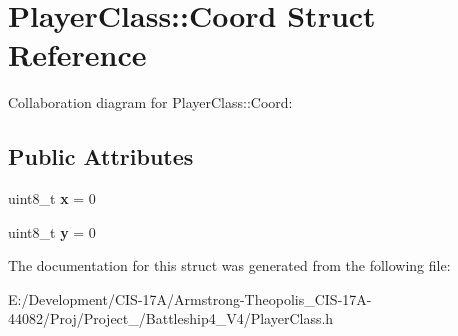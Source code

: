 \hypertarget{struct_player_class_1_1_coord}{}\section{Player\+Class\+::Coord Struct Reference}
\label{struct_player_class_1_1_coord}


Collaboration diagram for Player\+Class\+::Coord\+:
\subsection*{Public Attributes}
\begin{DoxyCompactItemize}
\item 
\mbox{\label{struct_player_class_1_1_coord_a4e31619759a35316f3d92f839202ea04}} 
uint8\+\_\+t {\bfseries x} = 0
\item 
\mbox{\label{struct_player_class_1_1_coord_add3d5b21bd7bba45189ebfe3c0737855}} 
uint8\+\_\+t {\bfseries y} = 0
\end{DoxyCompactItemize}


The documentation for this struct was generated from the following file\+:\begin{DoxyCompactItemize}
\item 
E\+:/\+Development/\+C\+I\+S-\/17\+A/\+Armstrong-\/\+Theopolis\+\_\+\+C\+I\+S-\/17\+A-\/44082/\+Proj/\+Project\+\_/\+Battleship4\+\_\+\+V4/Player\+Class.\+h\end{DoxyCompactItemize}
